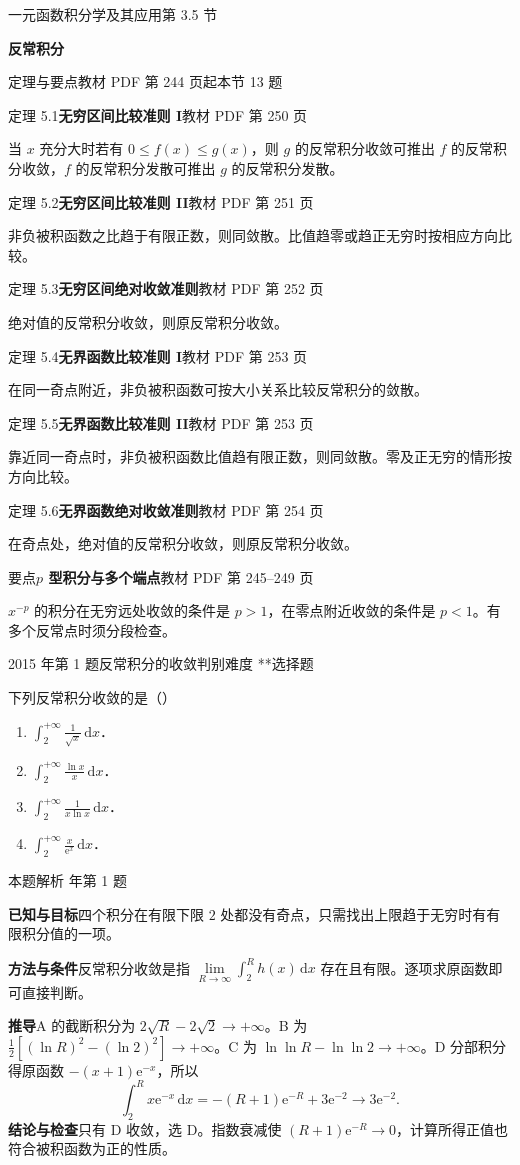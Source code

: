 \documentclass[UTF8,zihao=-4,fontset=fandol]{ctexart}
\renewcommand{\lim}{\operatorname*{lim}\limits}
\newcommand{\SectionHeading}[4]{%
  \clearpage\hypertarget{sec-#1}{}%
  {\small\textcolor{accent}{#2\hfill 第 #1 节}}\par\medskip
  {\LARGE\bfseries #3}\par\smallskip
  {\small\textcolor{muted}{#4}}\par\bigskip}
\newcommand{\Theory}[4]{%
  {\small\textcolor{accent}{#1}\quad\textbf{#3}\hfill\textcolor{muted}{教材 PDF 第 #2 页}}\par
  {\small #4}\par\smallskip}
\newcommand{\pickout}{\hfill（\hspace{1.4em}）}
\newenvironment{abcd}{\begin{enumerate}[label=\textup{(\Alph*)},leftmargin=2.3em,itemsep=1pt,topsep=4pt,parsep=1pt]}{\end{enumerate}}
\newcounter{BankQuestion}
\newcommand{\QuestionPage}[7]{%
  \stepcounter{BankQuestion}%
  \par\noindent\begin{minipage}{\linewidth}
  \raggedright
  {\small\textcolor{black!60}{#3\quad #5\quad 难度 #7}\hfill\textcolor{accent}{#2}}\par\smallskip}
\newcommand{\QuestionEnd}{\end{minipage}\par\medskip}
\newcommand{\QuestionPage}[7]{%
  \clearpage
  \stepcounter{BankQuestion}%
  {\small\textcolor{accent}{#1\hfill #2}}\par\medskip
  {\small\textcolor{black!60}{#3\quad #5\quad 难度 #7\hfill \arabic{BankQuestion} / 234}}\par\vspace{9bp}}
\newcommand{\QuestionEnd}{}
\newenvironment{QuestionSolution}[1]{%
  \clearpage
  {\small\textcolor{black!60}{本题解析\quad #1}}\par\medskip
}{\par\clearpage}
\begin{document}
\SectionHeading{3.5}{一元函数积分学及其应用}{反常积分}{定理与要点\quad 教材 PDF 第 244 页起\hfill 本节 13 题}
\Theory{定理 5.1}{250}{无穷区间比较准则 I}{当 \(x\) 充分大时若有 \(0\le f(x)\le g(x)\)，则 \(g\) 的反常积分收敛可推出 \(f\) 的反常积分收敛，\(f\) 的反常积分发散可推出 \(g\) 的反常积分发散。}
\Theory{定理 5.2}{251}{无穷区间比较准则 II}{非负被积函数之比趋于有限正数，则同敛散。比值趋零或趋正无穷时按相应方向比较。}
\Theory{定理 5.3}{252}{无穷区间绝对收敛准则}{绝对值的反常积分收敛，则原反常积分收敛。}
\Theory{定理 5.4}{253}{无界函数比较准则 I}{在同一奇点附近，非负被积函数可按大小关系比较反常积分的敛散。}
\Theory{定理 5.5}{253}{无界函数比较准则 II}{靠近同一奇点时，非负被积函数比值趋有限正数，则同敛散。零及正无穷的情形按方向比较。}
\Theory{定理 5.6}{254}{无界函数绝对收敛准则}{在奇点处，绝对值的反常积分收敛，则原反常积分收敛。}
\Theory{要点}{245--249}{\(p\) 型积分与多个端点}{\(x^{-p}\) 的积分在无穷远处收敛的条件是 \(p>1\)，在零点附近收敛的条件是 \(p<1\)。有多个反常点时须分段检查。}
\QuestionPage{3.5 反常积分}{选择题}{2015 年第 1 题}{1}{反常积分的收敛判别}{191 / 234}{**}
下列反常积分收敛的是\pickout{}
\begin{abcd}
\item $\int_2^{+\infty} \frac{1}{\sqrt{x}}\,\mathrm{d} x$．
\item $\int_2^{+\infty} \frac{\ln x}{x}\,\mathrm{d} x$．
\item $\int_2^{+\infty} \frac{1}{x\ln x}\,\mathrm{d} x$．
\item $\int_2^{+\infty} \frac{x}{\mathrm{e}^x}\,\mathrm{d} x$．
\end{abcd}
\QuestionEnd

\begin{QuestionSolution}{2015 年第 1 题}
\textbf{已知与目标}\quad 四个积分在有限下限 \(2\) 处都没有奇点，只需找出上限趋于无穷时有有限积分值的一项。

\textbf{方法与条件}\quad 反常积分收敛是指 \(\lim_{R\to\infty}\int_2^Rh(x)\,\mathrm{d}x\) 存在且有限。逐项求原函数即可直接判断。

\textbf{推导}\quad A 的截断积分为 \(2\sqrt R-2\sqrt2\to+\infty\)。B 为 \(\frac{1}{2}[(\ln R)^2-(\ln2)^2]\to+\infty\)。C 为 \(\ln\ln R-\ln\ln2\to+\infty\)。D 分部积分得原函数 \(-(x+1)\mathrm{e}^{-x}\)，所以
\[
\int_2^Rx\mathrm{e}^{-x}\,\mathrm{d}x
=-(R+1)\mathrm{e}^{-R}+3\mathrm{e}^{-2}\longrightarrow3\mathrm{e}^{-2}.
\]
\textbf{结论与检查}\quad 只有 D 收敛，选 \(\boxed{\mathrm{D}}\)。指数衰减使 \((R+1)\mathrm{e}^{-R}\to0\)，计算所得正值也符合被积函数为正的性质。
\end{QuestionSolution}
\end{document}
